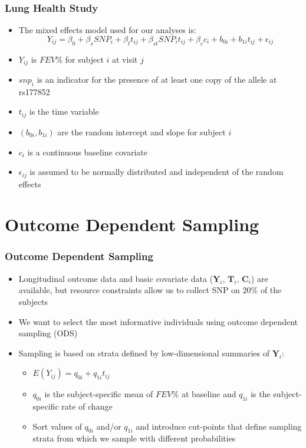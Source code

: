 \documentclass[pdf]{beamer}
\begin{document}
\begin{frame}
\frametitle{Lung Health Study}
\begin{itemize}
	\setlength\itemsep{0.8em}
	\item The mixed effects model used for our analyses is:
	\begin{equation}\nonumber
	Y_{ij} = \beta_0 + \beta_s SNP_i + \beta_t t_{ij} + \beta_{st}SNP_it_{ij} + \beta_c c_{i}+ b_{0i} + b_{1i}t_{ij} + \epsilon_{ij}
	\end{equation}
	\item $Y_{ij}$ is $FEV\%$ for subject $i$ at visit $j$
	\item $snp_i$ is an indicator for the presence of at least one copy of the allele at rs177852
	\item $t_{ij}$ is the time variable
	\item $(b_{0i}, b_{1i})$ are the random intercept and slope for subject $i$
	\item $c_i$ is a continuous baseline covariate
	\item $\epsilon_{ij}$ is assumed to be normally distributed and independent of the random effects
\end{itemize}
\end{frame}	


\section{Outcome Dependent Sampling}

\begin{frame}
\frametitle{Outcome Dependent Sampling}
\begin{itemize}
	\setlength\itemsep{0.8em}
	\item Longitudinal outcome data and basic covariate data ($\boldsymbol{Y}_i$, $\boldsymbol{T}_i$, $\boldsymbol{C}_i$) are available, but resource constraints allow us to collect SNP on $20\%$ of the subjects
	\item We want to select the most informative individuals using outcome dependent sampling (ODS)
	\item Sampling is based on strata defined by low-dimensional summaries of $\boldsymbol{Y}_i$:
	\begin{itemize}
		\item $E(Y_{ij}) = q_{0i} + q_{1i}t_{ij}$
		\item $q_{0i}$ is the subject-specific mean of $FEV\%$ at baseline and $q_{1i}$ is the subject-specific rate of change
		\item Sort values of $q_{0i}$ and/or $q_{1i}$ and introduce cut-points that define sampling strata from which we sample with different probabilities 
		\end{itemize}
\end{itemize}
\end{frame}
\end{document}
